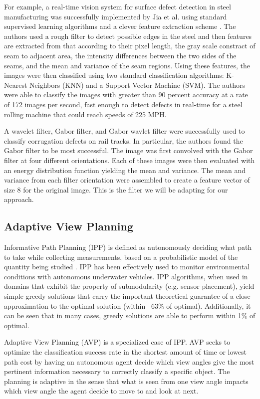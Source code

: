 \documentclass[letterpaper, 10 pt, conference]{ieeeconf}  %
\begin{document}
For example, a real-time vision system for surface defect detection in steel manufacturing was successfully implemented by Jia et al. using standard supervised learning algorithms and a clever feature extraction scheme \cite{steelDefect}. The authors used a rough filter to detect possible edges in the steel and then features are extracted from that according to their pixel length, the gray scale constract of seam to adjacent area, the intensity differences between the two sides of the seams, and the mean and variance of the seam regions. Using these features, the images were then classified using two standard classification algorithms: K-Nearest Neighbors (KNN) and a Support Vector Machine (SVM). The authors were able to classify the images with greater than 90 percent accuracy at a rate of 172 images per second, fast enough to detect defects in real-time for a steel rolling machine that could reach speeds of 225 MPH.

A wavelet filter, Gabor filter, and Gabor wavlet filter were successfully used to classify corrugation defects on rail tracks\cite{railDefect}. In particular, the authors found the Gabor filter to be most successful. The image was first convolved with the Gabor filter at four different orientations. Each of these images were then evaluated with an energy distribution function yielding the mean and variance.  The mean and variance from each filter orientation were assembled to create a feature vector of size 8 for the original image. This is the filter we will be adapting for our approach.

\subsection{Adaptive View Planning}

Informative Path Planning (IPP) is defined as autonomously deciding what path to take while collecting measurements, based on a probabilistic model of the quantity being studied \cite{BNBIPP}. IPP has been effectively used to monitor environmental conditions with autonomous underwater vehicles\cite{BNBIPP}\cite{underwaterIPP}. IPP algorithms, when used in domains that exhibit the property of submodularity (e.g. sensor placement), yield simple greedy solutions that carry the important theoretical guarantee of a close approximation to the optimal solution (within ~63\% of optimal). Additionally, it can be seen that in many cases, greedy solutions are able to perform within 1\% of optimal. 

Adaptive View Planning (AVP) is a specialized case of IPP. AVP seeks to optimize the classification success rate in the shortest amount of time or lowest path cost by having an autonomous agent decide which view angles give the most pertinent information necessary to correctly classify a specific object. The planning is adaptive in the sense that what is seen from one view angle impacts which view angle the agent decide to move to and look at next\cite{hollinger2011active}. 
\end{document}
